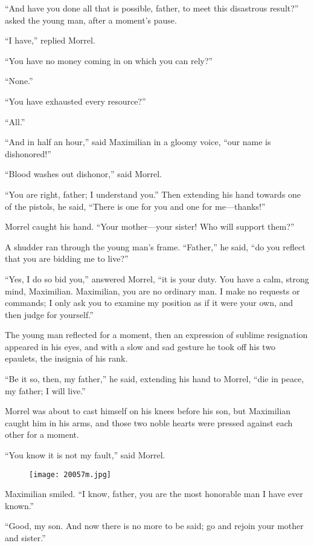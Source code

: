 “And have you done all that is possible, father, to meet this
disastrous result?” asked the young man, after a moment’s pause.

“I have,” replied Morrel.

“You have no money coming in on which you can rely?”

“None.”

“You have exhausted every resource?”

“All.”

“And in half an hour,” said Maximilian in a gloomy voice, “our name is
dishonored!”

“Blood washes out dishonor,” said Morrel.

“You are right, father; I understand you.” Then extending his hand
towards one of the pistols, he said, “There is one for you and one for
me—thanks!”

Morrel caught his hand. “Your mother—your sister! Who will support
them?”

A shudder ran through the young man’s frame. “Father,” he said, “do you
reflect that you are bidding me to live?”

“Yes, I do so bid you,” answered Morrel, “it is your duty. You have a
calm, strong mind, Maximilian. Maximilian, you are no ordinary man. I
make no requests or commands; I only ask you to examine my position as
if it were your own, and then judge for yourself.”

The young man reflected for a moment, then an expression of sublime
resignation appeared in his eyes, and with a slow and sad gesture he
took off his two epaulets, the insignia of his rank.

“Be it so, then, my father,” he said, extending his hand to Morrel,
“die in peace, my father; I will live.”

Morrel was about to cast himself on his knees before his son, but
Maximilian caught him in his arms, and those two noble hearts were
pressed against each other for a moment.

“You know it is not my fault,” said Morrel.

\begin{figure}[ht]
\texttt{[image: 20057m.jpg]}
\end{figure}

Maximilian smiled. “I know, father, you are the most honorable man I
have ever known.”

“Good, my son. And now there is no more to be said; go and rejoin your
mother and sister.”

